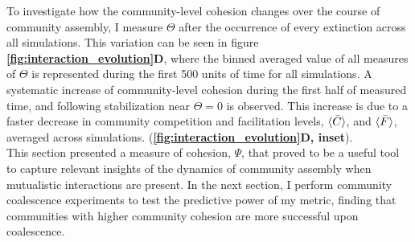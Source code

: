 \documentclass[titlepage,11pt]{article}
\begin{document}
\begin{linenumbers}
\begin{singlespace}
To investigate how the community-level cohesion changes over the course of community assembly, I measure $ \Theta $ after the occurrence of every extinction across all simulations. This variation can be seen in figure \textbf{\ref{fig:interaction_evolution}D}, where the binned averaged value of all measures of $ \Theta $ is represented during the first 500 units of time for all simulations. A systematic increase of community-level cohesion during the first half of measured time, and following stabilization near $ \Theta = 0 $ is observed. This increase is due to a faster decrease in community competition and facilitation levels, $ \braket{\bar{C}} $, and $ \braket{\bar{F}} $, averaged across simulations.  (\textbf{\ref{fig:interaction_evolution}D, inset}).\\

This section presented a measure of cohesion,  $ \Psi $, that proved to be a useful tool to capture relevant insights of the dynamics of community assembly when mutualistic interactions are present. In the next section, I perform community coalescence experiments to test the predictive power of my metric, finding that communities with higher community cohesion are more successful upon coalescence.

\end{singlespace}
\end{linenumbers}
\end{document}
